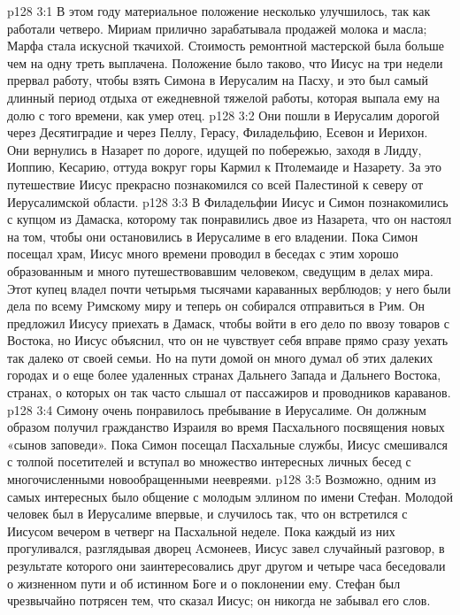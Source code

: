 \vs p128 3:1 В этом году материальное положение несколько улучшилось, так как работали четверо. Мириам прилично зарабатывала продажей молока и масла; Марфа стала искусной ткачихой. Стоимость ремонтной мастерской была больше чем на одну треть выплачена. Положение было таково, что Иисус на три недели прервал работу, чтобы взять Симона в Иерусалим на Пасху, и это был самый длинный период отдыха от ежедневной тяжелой работы, которая выпала ему на долю с того времени, как умер отец.
\vs p128 3:2 Они пошли в Иерусалим дорогой через Десятиградие и через Пеллу, Герасу, Филадельфию, Есевон и Иерихон. Они вернулись в Назарет по дороге, идущей по побережью, заходя в Лидду, Иоппию, Кесарию, оттуда вокруг горы Кармил к Птолемаиде и Назарету. За это путешествие Иисус прекрасно познакомился со всей Палестиной к северу от Иерусалимской области.
\vs p128 3:3 В Филадельфии Иисус и Симон познакомились с купцом из Дамаска, которому так понравились двое из Назарета, что он настоял на том, чтобы они остановились в Иерусалиме в его владении. Пока Симон посещал храм, Иисус много времени проводил в беседах с этим хорошо образованным и много путешествовавшим человеком, сведущим в делах мира. Этот купец владел почти четырьмя тысячами караванных верблюдов; у него были дела по всему Pимскому миру и теперь он собирался отправиться в Pим. Он предложил Иисусу приехать в Дамаск, чтобы войти в его дело по ввозу товаров с Востока, но Иисус объяснил, что он не чувствует себя вправе прямо сразу уехать так далеко от своей семьи. Но на пути домой он много думал об этих далеких городах и о еще более удаленных странах Дальнего Запада и Дальнего Востока, странах, о которых он так часто слышал от пассажиров и проводников караванов.
\vs p128 3:4 Симону очень понравилось пребывание в Иерусалиме. Он должным образом получил гражданство Израиля во время Пасхального посвящения новых «сынов заповеди». Пока Симон посещал Пасхальные службы, Иисус смешивался с толпой посетителей и вступал во множество интересных личных бесед с многочисленными новообращенными неевреями.
\vs p128 3:5 Возможно, одним из самых интересных было общение с молодым эллином по имени Стефан. Молодой человек был в Иерусалиме впервые, и случилось так, что он встретился с Иисусом вечером в четверг на Пасхальной неделе. Пока каждый из них прогуливался, разглядывая дворец Aсмонеев, Иисус завел случайный разговор, в результате которого они заинтересовались друг другом и четыре часа беседовали о жизненном пути и об истинном Боге и о поклонении ему. Стефан был чрезвычайно потрясен тем, что сказал Иисус; он никогда не забывал его слов.
